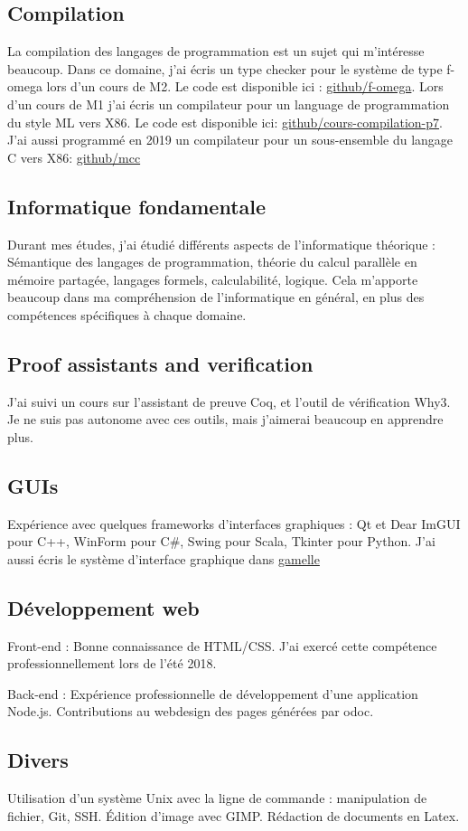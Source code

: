 \documentclass[10pt, a4paper, roman, french]{moderncv}
\begin{document}
	
		\subsection{Compilation}
			La compilation des langages de programmation est un sujet qui m'intéresse beaucoup. Dans ce domaine, j'ai écris un type checker pour le système de type f-omega lors d'un cours de M2. Le code est disponible ici : \href{https://github.com/EmileTrotignon/f-omega}{github/f-omega}.
Lors d'un cours de M1 j'ai écris un compilateur pour un  language de programmation du style ML vers X86.
Le code est disponible ici: \href{https://github.com/EmileTrotignon/cours-compilation-p7}{github/cours-compilation-p7}.
J'ai aussi programmé en 2019 un compilateur pour un sous-ensemble du langage C vers X86: \href{https://github.com/EmileTrotignon/mcc}{github/mcc}

	
		\subsection{Informatique fondamentale}
			Durant mes études, j'ai étudié différents aspects de l'informatique théorique :
Sémantique des langages de programmation, théorie du calcul parallèle en mémoire partagée, langages formels, calculabilité, logique.
Cela m'apporte beaucoup dans ma compréhension de l'informatique en général, en plus des compétences spécifiques à chaque domaine.

	
		\subsection{Proof assistants and verification}
			J'ai suivi un cours sur l'assistant de preuve Coq, et l'outil de vérification Why3. Je ne suis pas autonome avec ces outils, mais j'aimerai beaucoup en apprendre plus.

	
		\subsection{GUIs}
			Expérience avec quelques frameworks d'interfaces graphiques :
Qt et Dear ImGUI pour C++, WinForm pour C\#, Swing pour Scala, Tkinter pour Python. J'ai aussi écris le système d'interface graphique dans \href{https://github.com/art-w/gamelle/}{gamelle}

	
		\subsection{Développement web}
			Front-end : Bonne connaissance de HTML/CSS. J'ai exercé cette compétence professionnellement lors de l'été 2018.

Back-end : Expérience professionnelle de développement d'une application Node.js. Contributions au webdesign des pages générées par odoc.

	
		\subsection{Divers}
			Utilisation d'un système Unix avec la ligne de commande : manipulation de fichier, Git, SSH.
Édition d'image avec GIMP.
Rédaction de documents en Latex.

	
\end{document}

